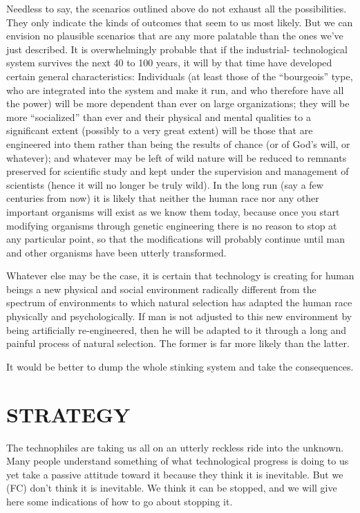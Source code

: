  Needless to say, the scenarios outlined above do not exhaust all the possibilities. They only indicate the kinds of outcomes that seem to us most likely. But we can envision no plausible scenarios that are any more palatable than the ones we’ve just described. It is overwhelmingly probable that if the industrial- technological system survives the next 40 to 100 years, it will by that time have developed certain general characteristics: Individuals (at least those of the “bourgeois” type, who are integrated into the system and make it run, and who therefore have all the power) will be more dependent than ever on large organizations; they will be more “socialized” than ever and their physical and mental qualities to a significant extent (possibly to a very great extent) will be those that are engineered into them rather than being the results of chance (or of God’s will, or whatever); and whatever may be left of wild nature will be reduced to remnants preserved for scientific study and kept under the supervision and management of scientists (hence it will no longer be truly wild). In the long run (say a few centuries from now) it is likely that neither the human race nor any other important organisms will exist as we know them today, because once you start modifying organisms through genetic engineering there is no reason to stop at any particular point, so that the modifications will probably continue until man and other organisms have been utterly transformed.

 Whatever else may be the case, it is certain that technology is creating for human beings a new physical and social environment radically different from the spectrum of environments to which natural selection has adapted the human race physically and psychologically. If man is not adjusted to this new environment by being artificially re-engineered, then he will be adapted to it through a long and painful process of natural selection. The former is far more likely than the latter.

 It would be better to dump the whole stinking system and take the consequences.

\chapter{STRATEGY}

 The technophiles are taking us all on an utterly reckless ride into the unknown. Many people understand something of what technological progress is doing to us yet take a passive attitude toward it because they think it is inevitable. But we (FC) don’t think it is inevitable. We think it can be stopped, and we will give here some indications of how to go about stopping it.

